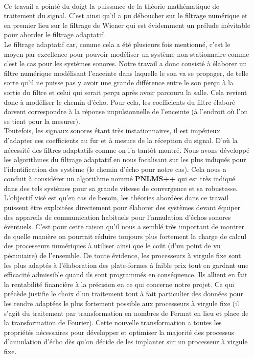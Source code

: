 \paragraph{}
Ce travail a pointé du doigt la puissance de la théorie mathématique de traitement du signal. C'est ainsi  qu'il a pu déboucher sur le filtrage numérique et en premier lieu sur le filtrage de Wiener qui est évidemment un prélude inévitable pour aborder le filtrage adaptatif.\\
Le filtrage adaptatif car, comme cela a été plusieurs fois mentionné, c'est le moyen par excellence pour pouvoir modéliser un système non stationnaire comme c'est le cas pour les systèmes sonores. Notre travail a donc consisté à élaborer un filtre numérique modélisant l'enceinte dans laquelle le son va se propager, de telle sorte qu'il ne puisse pas y avoir une grande différence entre le son perçu à la sortie du filtre et celui qui serait perçu après avoir parcouru la salle. Cela revient donc à modéliser le chemin d'écho. Pour cela, les coefficients du filtre élaboré doivent correspondre à la réponse impulsionnelle de l'enceinte (à l'endroit où l'on se tient pour la mesurer).\\
Toutefois, les signaux sonores étant très instationnaires, il est impérieux d'adapter ces coefficients au fur et à mesure de la réception du signal. D'où la nécessité des filtres adaptatifs comme on l'a tantôt montré. Nous avons développé les algorithmes du filtrage adaptatif en nous focalisant sur les plus indiqués pour l'identification des système (le chemin d'écho pour notre cas). Cela nous a conduit à considérer un algorithme nommé \textbf{PNLMS++} qui est très indiqué dans des tels systèmes pour sa grande vitesse de convergence et sa robustesse.\\
L'objectif visé est qu'en cas de besoin, les théories abordées dans ce travail puissent être exploitées directement pour élaborer des systèmes devant équiper des appareils de communication habituels pour l'annulation d'échos sonores éventuels. C'est pour cette raison qu'il nous a semblé très important de montrer de quelle manière on pourrait réduire toujours plus fortement la charge de calcul des processeurs numériques à utiliser ainsi que le coût (d'un point de vu pécuniaire) de l'ensemble. De toute évidence, les processeurs à virgule fixe sont les plus adaptés à l'élaboration des plate-formes à faible prix tout en gardant une efficacité admissible quand ils sont programmés en conséquence. Ils allient en fait la rentabilité financière à la précision en ce qui concerne notre projet. Ce qui précède justifie le choix d'un traitement tout à fait particulier des données pour les rendre adaptées le plus fortement possible aux processeurs à virgule fixe (il s'agit du traitement par transformation en nombres de Fermat en lieu et place de la transformation de Fourier). Cette nouvelle transformation a toutes les propriétés nécessaires pour développer et optimiser la majorité des processus d'annulation d'écho dès qu'on décide de les implanter sur un processeur à virgule fixe.\\
